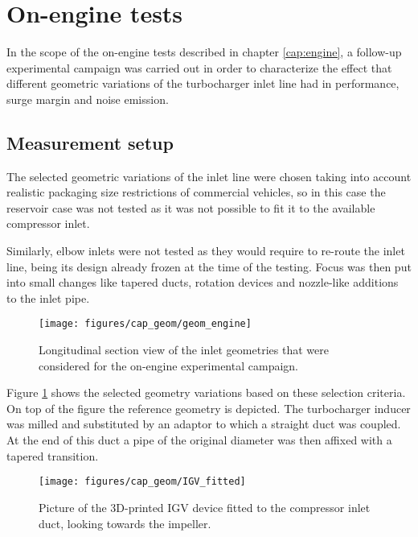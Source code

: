\section{On-engine tests}

In the scope of the on-engine tests described in chapter \ref{cap:engine}, a follow-up experimental campaign was carried out in order to characterize the effect that different geometric variations of the turbocharger inlet line had in performance, surge margin and noise emission.

\subsection{Measurement setup}

The selected geometric variations of the inlet line were chosen taking into account realistic packaging size restrictions of commercial vehicles, so in this case the reservoir case was not tested as it was not possible to fit it to the available compressor inlet. 

Similarly, elbow inlets were not tested as they would require to re-route the inlet line, being its design already frozen at the time of the testing. Focus was then put into small changes like tapered ducts, rotation devices and nozzle-like additions to the inlet pipe.

\begin{figure}[h!]
\centering
\texttt{[image: figures/cap\_geom/geom\_engine]}
\caption{Longitudinal section view of the inlet geometries that were considered for the on-engine experimental campaign.}
\label{fig:geom_engine}
\end{figure}

Figure \ref{fig:geom_engine} shows the selected geometry variations based on these selection criteria. On top of the figure the reference geometry is depicted. The turbocharger inducer was milled and substituted by an adaptor to which a straight duct was coupled. At the end of this duct a pipe of the original diameter was then affixed with a tapered transition.

\begin{wrapfigure}{o}[7mm]{0.4\textwidth}
\centering
\texttt{[image: figures/cap\_geom/IGV\_fitted]}
\caption{Picture of the 3D-printed IGV device fitted to the compressor inlet duct, looking towards the impeller.}
\label{fig:IGV_fitted}
\end{wrapfigure}

